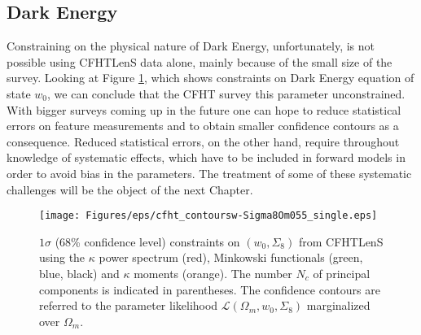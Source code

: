 \subsection{Dark Energy}
Constraining on the physical nature of Dark Energy, unfortunately, is not possible using CFHTLenS data alone, mainly because of the small size of the survey. Looking at Figure \ref{fig:6:cwSi855signle}, which shows constraints on Dark Energy equation of state $w_0$, we can conclude that the CFHT survey this parameter unconstrained. With bigger surveys coming up in the future one can hope to reduce statistical errors on feature measurements and to obtain smaller confidence contours as a consequence. Reduced statistical errors, on the other hand, require throughout knowledge of systematic effects, which have to be included in forward models in order to avoid bias in the parameters. The treatment of some of these systematic challenges will be the object of the next Chapter. 
%
\begin{figure}[h!]
\begin{center}
\texttt{[image: Figures/eps/cfht\_contoursw-Sigma8Om055\_single.eps]}
\end{center}
\caption{$1\sigma$ (68\% confidence level) constraints on $(w_0,\Sigma_8)$ from CFHTLenS using the $\kappa$ power spectrum (red), Minkowski functionals (green, blue, black) and $\kappa$ moments (orange). The number $N_c$ of principal components is indicated in parentheses. The confidence contours are referred to the parameter likelihood $\mathcal{L}(\Omega_m,w_0,\Sigma_8)$ marginalized over $\Omega_m$.}
\label{fig:6:cwSi855signle}
\end{figure}


